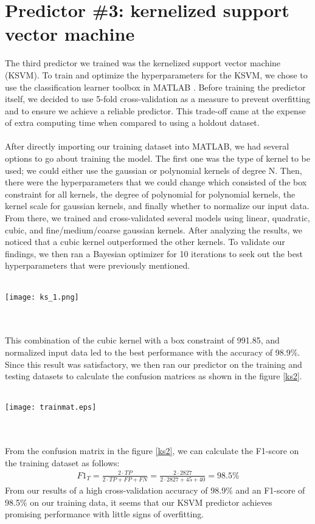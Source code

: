 \documentclass{article}
\newcommand{\enterProblemHeader}[1]{
\nobreak\extramarks{#1}{#1}\nobreak
\nobreak\extramarks{#1}{#1}\nobreak
}
\newcommand{\exitProblemHeader}[1]{
\nobreak\extramarks{#1}{#1}\nobreak
\nobreak\extramarks{#1}{}\nobreak
}
\newcounter{homeworkProblemCounter} %
\newcommand{\homeworkProblemName}{}
\newenvironment{homeworkProblem}[1][Problem \arabic{homeworkProblemCounter}]{ %
\stepcounter{homeworkProblemCounter} %
\renewcommand{\homeworkProblemName}{#1} %
\section{\homeworkProblemName} %
\enterProblemHeader{} %
}{
\exitProblemHeader{} %
}
\begin{document}
\begin{homeworkProblem}[Predictor \#3: kernelized support vector machine]
The third predictor we trained was the kernelized support vector machine (KSVM). To train and optimize the hyperparameters for the KSVM, we chose to use the classification learner toolbox in MATLAB \cite{matlab2}. Before training the predictor itself, we decided to use 5-fold cross-validation as a measure to prevent overfitting and to ensure we achieve a reliable predictor. This trade-off came at the expense of extra computing time when compared to using a holdout dataset. 
\\
\\
After directly importing our training dataset into MATLAB, we had several options to go about training the model. The first one was the type of kernel to be used; we could either use the gaussian or polynomial kernels of degree N. Then, there were the hyperparameters that we could change which consisted of the box constraint for all kernels, the degree of polynomial for polynomial kernels, the kernel scale for gaussian kernels, and finally whether to normalize our input data. From there, we trained and cross-validated several models using linear, quadratic, cubic, and fine/medium/coarse gaussian kernels. After analyzing the results, we noticed that a cubic kernel outperformed the other kernels. To validate our findings, we then ran a Bayesian optimizer for 10 iterations to seek out the best hyperparameters that were previously mentioned.
\\
\\
\begin{minipage}{\textwidth}
\centering
    \texttt{[image: ks\_1.png]}
 \label{ks1}
\end{minipage}
\\
\\
This combination of the cubic kernel with a box constraint of 991.85, and normalized input data led to the best performance with the accuracy of 98.9\%. Since this result was satisfactory, we then ran our predictor on the training and testing datasets to calculate the confusion matrices as shown in the figure \ref{ks2}.
\\
\\
\begin{minipage}{\textwidth}
\centering
    \texttt{[image: trainmat.eps]}
 \label{ks2}
\end{minipage}
\\
\\
From the confusion matrix in the figure \ref{ks2}, we can calculate the F1-score on the training dataset as follows:
\begin{gather*}
    F1_T = \frac{2\cdot TP}{2\cdot TP + FP + FN} = \frac{2\cdot 2827}{2\cdot 2827 + 45 + 40} = \boldsymbol{98.5\%}
\end{gather*}
From our results of a high cross-validation accuracy of 98.9\% and an F1-score of 98.5\% on our training data, it seems that our KSVM predictor achieves promising performance with little signs of overfitting.
\end{homeworkProblem}
\end{document}
